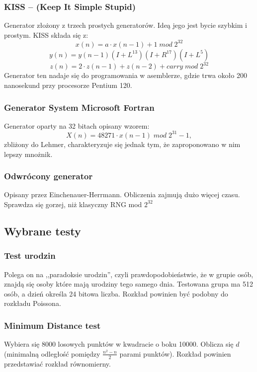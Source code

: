 \documentclass[11pt]{aghdpl}
\begin{document}
\subsubsection{KISS – (Keep It Simple Stupid)}
Generator złożony z trzech prostych generatorów. Ideą jego jest bycie szybkim i prostym. KISS składa się z:
\begin{equation}
x(n) = a \cdot x (n-1)+1 \; mod \; 2^{32}
\end{equation}
\begin{equation}
y(n)=y(n-1)(I+L^{13})(I+R^{17})(I+L^5)
\end{equation}
\begin{equation}
z(n)=2 \cdot z(n-1)+z(n-2) +carry \; mod \; 2^{32}
\end{equation}
Generator ten nadaje się do programowania w asemblerze, gdzie trwa około 200 nanosekund przy procesorze Pentium 120.
\subsubsection{Generator System Microsoft Fortran}
Generator oparty na 32 bitach opisany wzorem:
\begin{equation}
X ( n ) = 48271 \cdot x (n- 1 )\; mod\; 2 ^ {31}-1,
\end{equation}
zbliżony do Lehmer, charakteryzuje się jednak tym, że zaproponowano w nim lepszy mnożnik. 
\subsubsection{Odwrócony generator}
Opisany przez Einchenauer-Herrmann. Obliczenia zajmują dużo więcej czasu. Sprawdza się gorzej, niż klasyczny RNG mod $2^{32}$

\subsection{Wybrane testy}
\subsubsection{Test urodzin}
Polega on na ,,paradoksie urodzin'', czyli prawdopodobieństwie, że w grupie osób, znajdą się osoby które mają urodziny tego samego dnia. Testowana grupa ma 512 osób, a dzień określa 24 bitowa liczba. Rozkład powinien być podobny do rozkładu Poissona.
\subsubsection{Minimum Distance test}
Wybiera się 8000 losowych punktów w kwadracie o boku 10000. Oblicza się $d$ (minimalną odległość pomiędzy $\frac{n^2 -n}{2}$ parami punktów). Rozkład powinien przedstawiać rozkład równomierny.
\end{document}
